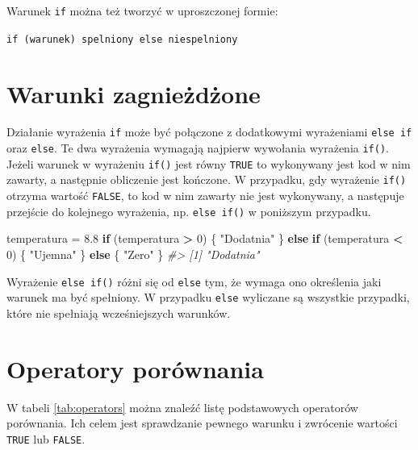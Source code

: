 \documentclass[paper=6in:9in,pagesize=pdftex,headinclude=on,footinclude=on,10pt]{scrbook}
\makeatletter
\newenvironment{Shaded}{\begin{snugshade}}{\end{snugshade}}
\newcommand{\CommentTok}[1]{\textcolor[rgb]{0.56,0.35,0.01}{\textit{#1}}}
\newcommand{\ControlFlowTok}[1]{\textcolor[rgb]{0.13,0.29,0.53}{\textbf{#1}}}
\newcommand{\DecValTok}[1]{\textcolor[rgb]{0.00,0.00,0.81}{#1}}
\newcommand{\FloatTok}[1]{\textcolor[rgb]{0.00,0.00,0.81}{#1}}
\newcommand{\NormalTok}[1]{#1}
\newcommand{\OperatorTok}[1]{\textcolor[rgb]{0.81,0.36,0.00}{\textbf{#1}}}
\newcommand{\StringTok}[1]{\textcolor[rgb]{0.31,0.60,0.02}{#1}}
\newenvironment{kframe}{%
\medskip{}
\setlength{\fboxsep}{.8em}
 \def\at@end@of@kframe{}%
 \ifinner\ifhmode%
  \def\at@end@of@kframe{\end{minipage}}%
  \begin{minipage}{\columnwidth}%
 \fi\fi%
 \def\FrameCommand##1{\hskip\@totalleftmargin \hskip-\fboxsep
 \colorbox{shadecolor}{##1}\hskip-\fboxsep
     \hskip-\linewidth \hskip-\@totalleftmargin \hskip\columnwidth}%
 \MakeFramed {\advance\hsize-\width
   \@totalleftmargin\z@ \linewidth\hsize
   \@setminipage}}%
 {\par\unskip\endMakeFramed%
 \at@end@of@kframe}
\newenvironment{rmdblock}[1]
  {
  \begin{itemize}
  \renewcommand{\labelitemi}{
    \raisebox{-.7\height}[0pt][0pt]{
      {\setkeys{Gin}{width=3em,keepaspectratio}\texttt{[image: images/\#1]}}
    }
  }
  \setlength{\fboxsep}{1em}
  \begin{kframe}
  \item
  }
  {
  \end{kframe}
  \end{itemize}
  }
\newenvironment{rmdinfo}
  {\begin{rmdblock}{compass}}
  {\end{rmdblock}}
\makeatother
\begin{document}
\begin{rmdinfo}
Warunek \texttt{if} można też tworzyć w uproszczonej formie:

\texttt{if\ (warunek)\ spelniony\ else\ niespelniony}
\end{rmdinfo}

\hypertarget{warunki-zagnieux17cdux17cone}{%
\section{Warunki zagnieżdżone}\label{warunki-zagnieux17cdux17cone}}

Działanie wyrażenia \texttt{if} może być połączone z dodatkowymi wyrażeniami \texttt{else\ if} oraz \texttt{else}.
Te dwa wyrażenia wymagają najpierw wywołania wyrażenia \texttt{if()}.
Jeżeli warunek w wyrażeniu \texttt{if()} jest równy \texttt{TRUE} to wykonywany jest kod w nim zawarty, a następnie obliczenie jest kończone.
W przypadku, gdy wyrażenie \texttt{if()} otrzyma wartość \texttt{FALSE}, to kod w nim zawarty nie jest wykonywany, a następuje przejście do kolejnego wyrażenia, np. \texttt{else\ if()} w poniższym przypadku.

\begin{Shaded}
\begin{Highlighting}[]
\NormalTok{temperatura =}\StringTok{ }\FloatTok{8.8}
\ControlFlowTok{if}\NormalTok{ (temperatura }\OperatorTok{>}\StringTok{ }\DecValTok{0}\NormalTok{) \{}
  \StringTok{"Dodatnia"}
\NormalTok{\} }\ControlFlowTok{else} \ControlFlowTok{if}\NormalTok{ (temperatura }\OperatorTok{<}\StringTok{ }\DecValTok{0}\NormalTok{) \{}
  \StringTok{"Ujemna"}
\NormalTok{\} }\ControlFlowTok{else}\NormalTok{ \{}
  \StringTok{"Zero"}
\NormalTok{\}}
\CommentTok{#> [1] "Dodatnia"}
\end{Highlighting}
\end{Shaded}

Wyrażenie \texttt{else\ if()} różni się od \texttt{else} tym, że wymaga ono określenia jaki warunek ma być spełniony.
W przypadku \texttt{else} wyliczane są wszystkie przypadki, które nie spełniają wcześniejszych warunków.

\hypertarget{operatory-poruxf3wnania}{%
\section{Operatory porównania}\label{operatory-poruxf3wnania}}

W tabeli \ref{tab:operators} można znaleźć listę podstawowych operatorów porównania.
Ich celem jest sprawdzanie pewnego warunku i zwrócenie wartości \texttt{TRUE} lub \texttt{FALSE}.
\end{document}
